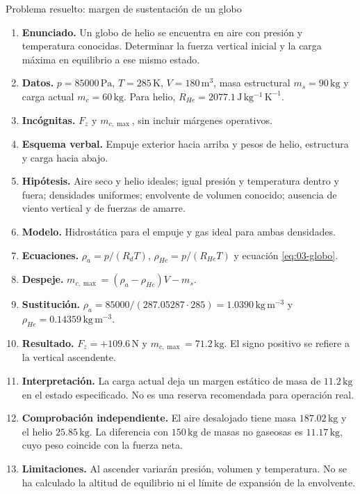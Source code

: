 \begin{studiumworked}{Problema resuelto: margen de sustentación de un globo}

\begin{enumerate}
\item \textbf{Enunciado.} Un globo de helio se encuentra en aire con presión y temperatura conocidas. Determinar la fuerza vertical inicial y la carga máxima en equilibrio a ese mismo estado.
\item \textbf{Datos.} $p=85000\,\mathrm{Pa}$, $T=285\,\mathrm{K}$, $V=180\,\mathrm{m^3}$, masa estructural $m_s=90\,\mathrm{kg}$ y carga actual $m_c=60\,\mathrm{kg}$. Para helio, $R_{He}=2077.1\,\mathrm{J\,kg^{-1}\,K^{-1}}$.
\item \textbf{Incógnitas.} $F_z$ y $m_{c,\max}$, sin incluir márgenes operativos.
\item \textbf{Esquema verbal.} Empuje exterior hacia arriba y pesos de helio, estructura y carga hacia abajo.
\item \textbf{Hipótesis.} Aire seco y helio ideales; igual presión y temperatura dentro y fuera; densidades uniformes; envolvente de volumen conocido; ausencia de viento vertical y de fuerzas de amarre.
\item \textbf{Modelo.} Hidrostática para el empuje y gas ideal para ambas densidades.
\item \textbf{Ecuaciones.} $\rho_a=p/(R_dT)$, $\rho_{He}=p/(R_{He}T)$ y ecuación \eqref{eq:03-globo}.
\item \textbf{Despeje.} $m_{c,\max}=(\rho_a-\rho_{He})V-m_s$.
\item \textbf{Sustitución.} $\rho_a=85000/(287.05287\cdot285)=1.0390\,\mathrm{kg\,m^{-3}}$ y $\rho_{He}=0.14359\,\mathrm{kg\,m^{-3}}$.
\item \textbf{Resultado.} $F_z=+109.6\,\mathrm{N}$ y $m_{c,\max}=71.2\,\mathrm{kg}$. El signo positivo se refiere a la vertical ascendente.
\item \textbf{Interpretación.} La carga actual deja un margen estático de masa de $11.2\,\mathrm{kg}$ en el estado especificado. No es una reserva recomendada para operación real.
\item \textbf{Comprobación independiente.} El aire desalojado tiene masa $187.02\,\mathrm{kg}$ y el helio $25.85\,\mathrm{kg}$. La diferencia con $150\,\mathrm{kg}$ de masas no gaseosas es $11.17\,\mathrm{kg}$, cuyo peso coincide con la fuerza neta.
\item \textbf{Limitaciones.} Al ascender variarán presión, volumen y temperatura. No se ha calculado la altitud de equilibrio ni el límite de expansión de la envolvente.
\end{enumerate}


\end{studiumworked}

